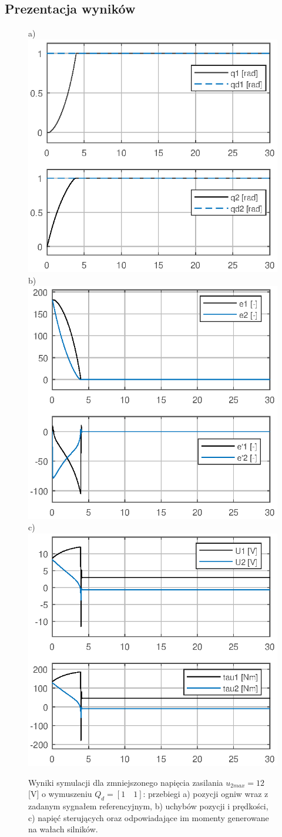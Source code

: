 \documentclass[12pt, a4paper, polish]{article}
\begin{document}
	\subsection{Prezentacja wyników}
	\begin{figure}[h]
		\centering	
		a) \includegraphics[width=0.30\columnwidth]{SRManCw4/SRManL4_ZADANIE1/figs/01Pozycje_U12} b)\includegraphics[width=0.30\columnwidth]{SRManCw4/SRManL4_ZADANIE1/figs/01Uchyby_U12} c)\includegraphics[width=0.30\columnwidth]{SRManCw4/SRManL4_ZADANIE1/figs/01Sygnaly_U12}\caption{
			Wyniki symulacji dla zmniejszonego napięcia zasilania $u_{2max}=12$ [V] o wymuszeniu $Q_d=[1\quad1]$: przebiegi a) pozycji ogniw wraz z zadanym sygnałem referencyjnym, b) uchybów pozycji i prędkości, c)  napięć sterujących oraz odpowiadające im momenty generowane na wałach silników.}\label{fig:hiperkula12v}
	\end{figure}
\end{document}
